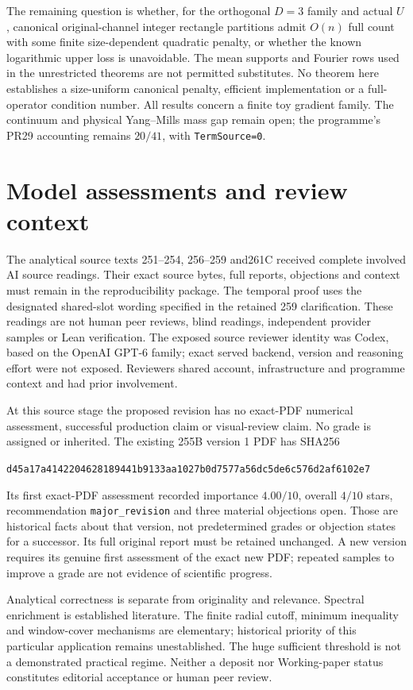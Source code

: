 \documentclass[11pt,a4paper]{article}
\begin{document}
The remaining question is whether, for the orthogonal $D=3$ family and actual
$U$, canonical original-channel integer rectangle partitions admit $O(n)$ full
count with some finite size-dependent quadratic penalty, or whether the
known logarithmic upper loss is unavoidable. The mean supports and Fourier
rows used in the unrestricted theorems are not permitted substitutes.
No theorem here establishes a size-uniform canonical penalty, efficient
implementation or a full-operator condition number. All results concern a
finite toy gradient family. The continuum and physical Yang--Mills mass gap
remain open; the programme's PR29 accounting remains $20/41$, with
\texttt{TermSource=0}.

\section{Model assessments and review context}
The analytical source texts 251--254, 256--259 and261C received complete involved
AI source readings. Their exact source bytes, full reports, objections and
context must remain in the reproducibility package. The temporal proof
uses the designated shared-slot wording specified in the retained 259
clarification. These readings are not human peer reviews, blind readings,
independent provider samples or Lean verification. The exposed source
reviewer identity was Codex, based on the OpenAI GPT-6 family; exact served
backend, version and reasoning effort were not exposed. Reviewers shared
account, infrastructure and programme context and had prior involvement.

At this source stage the proposed revision has no exact-PDF numerical
assessment, successful production claim or visual-review claim. No grade is
assigned or inherited. The existing 255B version 1 PDF has SHA256
\begin{center}
\small\texttt{d45a17a4142204628189441b9133aa1027b0d7577a56dc5de6c576d2af6102e7}
\end{center}
Its first exact-PDF assessment recorded importance $4.00/10$, overall
$4/10$ stars, recommendation \texttt{major\_revision} and three material
objections open. Those are historical facts about that version, not
predetermined grades or objection states for a successor. Its full original
report must be retained unchanged. A new version requires its genuine first
assessment of the exact new PDF; repeated samples to improve a grade are
not evidence of scientific progress.

Analytical correctness is separate from originality and relevance. Spectral
enrichment is established literature. The finite radial cutoff, minimum
inequality and window-cover mechanisms are elementary; historical priority
of this particular application remains unestablished. The huge sufficient
threshold is not a demonstrated practical regime. Neither a deposit nor
Working-paper status constitutes editorial acceptance or human peer review.
\end{document}
